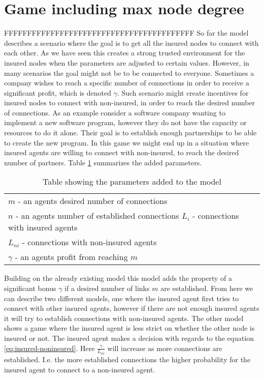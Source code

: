

\section{Game including max node degree}

FFFFFFFFFFFFFFFFFFFFFFFFFFFFFFFFFFFFFFFFF
So far the model describes a scenario where the goal is to get all the insured nodes to connect with each other. As we have seen this creates a strong trusted environment for the insured nodes when the parameters are adjusted to certain values. However, in many scenarios the goal might not be to be connected to everyone. Sometimes a company wishes to reach a specific number of connections in order to receive a significant profit, which is denoted $\gamma$. Such scenario might create incentives for insured nodes to connect with non-insured, in order to reach the desired number of connections. As an example consider a software company wanting to implement a new software program, however they do not have the capacity or resources to do it alone. Their goal is to establish enough partnerships to be able to create the new program. In this game we might end up in a situation where insured agents are willing to connect with non-insured, to reach the desired number of partners. Table \ref{tbl:model3para} summarizes the added parameters. 

\begin{table}[h]
\centering
\begin{tabular}{lc}
 \hline
  $m$ - an agents desired number of connections\\
  $n$ - an agents number of established connections
  $L_{i}$ - connections with insured agents \\
  $L_{ni}$ - connections with non-insured agents\\
  $\gamma$ - an agents profit from reaching $m$ \\
  \hline
\end{tabular}
\caption{Table showing the parameters added to the model \label{tbl:model3para}}
\end{table}


Building on the already existing model this model adds the property of a significant bonus $\gamma$ if a desired number of links $m$ are established. From here we can describe two different models, one where the insured agent first tries to connect with other insured agents, however if there are not enough insured agents it will try to establish connections with non-insured agents. The other model shows a game where the insured agent is less strict on whether the other node is insured or not. The insured agent makes a decision with regards to the equation \ref{eq:insured-noninsured}. Here $\frac{\gamma}{ L_{ni}}$ will increase as more connections are established. I.e. the more established connections the higher probability for the insured agent to connect to a non-insured agent.

